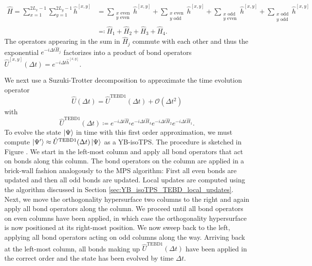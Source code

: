 \begin{equation}
	\label{eq:YB_isoTPS_TEBD_splitting_local_Hamiltonian}
	\begin{split}
		\hat{H} = \sum_{x=1}^{2L_x-1} \sum_{y=1}^{2L_y-1}\hat{h}^{[x,y]} &= \sum_{\substack{x\text{ even}\\y\text{ even}}} \hat{h}^{[x, y]} + \sum_{\substack{x\text{ even}\\y\text{ odd}}} \hat{h}^{[x, y]} + \sum_{\substack{x\text{ odd}\\y\text{ even}}} \hat{h}^{[x, y]} + \sum_{\substack{x\text{ odd}\\y\text{ odd}}} \hat{h}^{[x, y]} \\
		&\eqqcolon \hat{H}_1 + \hat{H}_2 + \hat{H}_3 + \hat{H}_4.
	\end{split}
\end{equation}
The operators appearing in the sum in $\hat{H}_j$ commute with each other and thus the exponential $e^{-i\Delta t\hat{H}_j}$ factorizes into a product of bond operators $\hat{U}^{[x, y]}(\Delta t) = e^{-i\Delta t\hat{h}^{[x, y]}}$. \par
We next use a Suzuki-Trotter decomposition to approximate the time evolution operator
\begin{equation}
	\label{eq:YB_isoTPS_TEBD_suzuki_trotter_first_order}
	\hat{U}(\Delta t) = \hat{U}^\text{TEBD1}(\Delta t) + \mathcal{O}(\Delta t^2)
\end{equation}
with
\begin{equation}
	\label{eq:YB_isoTPS_TEBD_first_order_TEBD_operator}
	\hat{U}^\text{TEBD1}(\Delta t) \coloneqq e^{-i\Delta t\hat{H}_4} e^{-i\Delta t\hat{H}_3} e^{-i\Delta t\hat{H}_2} e^{-i\Delta t\hat{H}_1}.
\end{equation}
To evolve the state $\ket{\Psi}$ in time with this first order approximation, we must compute $\ket{\Psi^\prime} \approx \hat{U}^\text{TEBD1}(\Delta t)\ket{\Psi}$ as a YB-isoTPS. The procedure is sketched in Figure . We start in the left-most column and apply all bond operators that act on bonds along this column. The bond operators on the column are applied in a brick-wall fashion analogously to the MPS algorithm: First all even bonds are updated and then all odd bonds are updated. Local updates are computed using the algorithm discussed in Section \ref{sec:YB_isoTPS_TEBD_local_updates}. Next, we move the orthogonality hypersurface two columns to the right and again apply all bond operators along the column. We proceed until all bond operators on even columns have been applied, in which case the orthogonality hypersurface is now positioned at its right-most position. We now sweep back to the left, applying all bond operators acting on odd columns along the way. Arriving back at the left-most column, all bonds making up $\hat{U}^\text{TEBD1}(\Delta t)$ have been applied in the correct order and the state has been evolved by time $\Delta t$. \par
